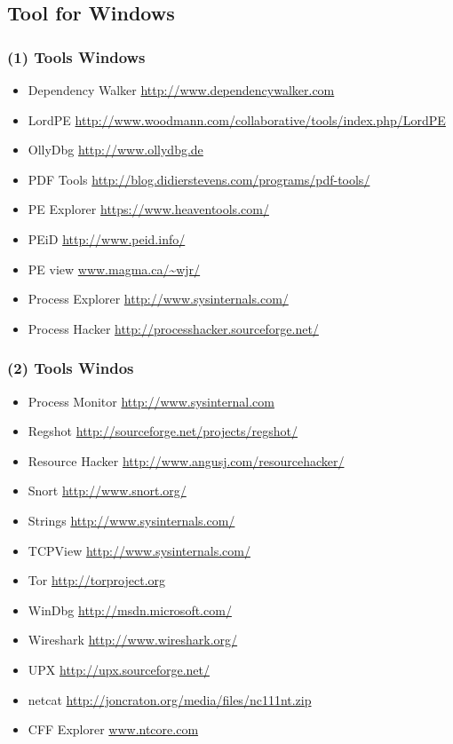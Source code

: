 \documentclass[]{beamer}
\begin{document}
	\subsection{Tool for Windows}
		\begin{frame}
			\frametitle{(1) Tools Windows}
			\begin{itemize}
				\item{Dependency Walker \url{http://www.dependencywalker.com}}
				\item{LordPE \url{http://www.woodmann.com/collaborative/tools/index.php/LordPE}}
				\item{OllyDbg \url{http://www.ollydbg.de}}
				\item{PDF Tools \url{http://blog.didierstevens.com/programs/pdf-tools/}}
				\item{PE Explorer \url{https://www.heaventools.com/}}
				\item{PEiD \url{http://www.peid.info/}}
				\item{PE view \url{www.magma.ca/~wjr/}}
				\item{Process Explorer \url{http://www.sysinternals.com/}}
				\item{Process Hacker \url{http://processhacker.sourceforge.net/}}
			\end{itemize}
		\end{frame}
		\begin{frame}
			\frametitle{(2) Tools Windos}
			\begin{itemize}
				\item{Process Monitor \url{http://www.sysinternal.com}}
				\item{Regshot \url{http://sourceforge.net/projects/regshot/}}
				\item{Resource Hacker \url{http://www.angusj.com/resourcehacker/}}
				\item{Snort \url{http://www.snort.org/}}
				\item{Strings \url{http://www.sysinternals.com/}}
				\item{TCPView \url{http://www.sysinternals.com/}}
				\item{Tor \url{http://torproject.org}}
				\item{WinDbg \url{http://msdn.microsoft.com/}}
				\item{Wireshark \url{http://www.wireshark.org/}}
				\item{UPX \url{http://upx.sourceforge.net/}}
				\item{netcat \url{http://joncraton.org/media/files/nc111nt.zip}}
				\item{CFF Explorer \url{www.ntcore.com}}
				
			\end{itemize}
		\end{frame}
\end{document}
